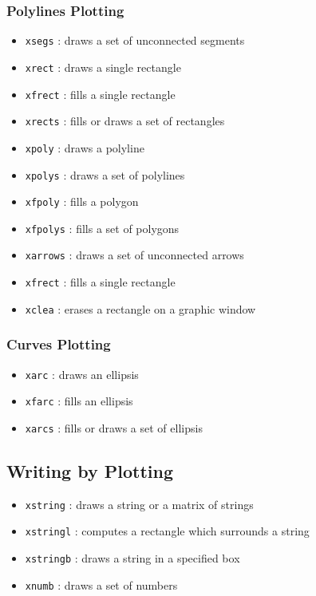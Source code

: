\subsubsection{Polylines Plotting}
\begin{itemize}
	\item \verb+xsegs+	: draws	a set of unconnected segments 
	\item \verb+xrect+	: draws	a single rectangle
	\item \verb+xfrect+	: fills a single rectangle
	\item \verb+xrects+	: fills or draws a set	of rectangles
	\item \verb+xpoly+	: draws	a polyline
	\item \verb+xpolys+	: draws a set of polylines
	\item \verb+xfpoly+	: fills a polygon
	\item \verb+xfpolys+	: fills a set of polygons
	\item \verb+xarrows+	: draws a set of unconnected arrows
	\item \verb+xfrect+	: fills a single rectangle
	\item \verb+xclea+	: erases a rectangle on a graphic window
\end{itemize}
%
\subsubsection{Curves Plotting}
\begin{itemize}
	\item \verb+xarc+	: draws	an ellipsis
	\item \verb+xfarc+	: fills	an ellipsis
	\item \verb+xarcs+	: fills	or draws a set of ellipsis
\end{itemize}
%

\subsection{Writing by Plotting }
%
\begin{itemize}
	\item  \verb+xstring+	: draws a string or a matrix of strings
        \item  \verb+xstringl+	: computes a rectangle which surrounds a string
	\item  \verb+xstringb+	: draws a string in a specified box
	\item  \verb+xnumb+	: draws a set of numbers
\end{itemize}
%

